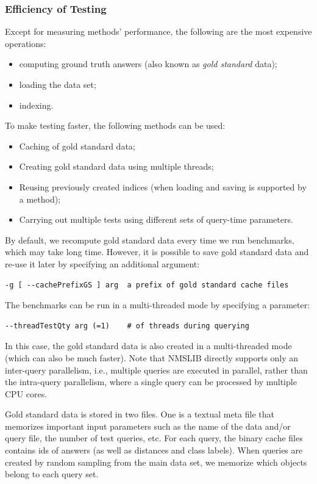 \documentclass[runningheads,a4paper]{llncs}
\begin{document}
{\subsubsection{Efficiency of Testing}\label{SectionBenchEfficiency}
Except for  measuring methods' performance, 
the following are the most expensive operations: 
\begin{itemize}
\item computing ground truth answers (also
known as \emph{gold standard} data);
\item loading the data set; 
\item indexing. 
\end{itemize}
To make testing faster, the following methods can be used: 
\begin{itemize}
\item Caching of gold standard data;
\item Creating gold standard data using multiple threads; 
\item Reusing previously created indices (when loading and saving is supported by a method);
\item Carrying out multiple tests using different sets of query-time parameters. 
\end{itemize}

By default, we recompute gold standard data every time we run benchmarks, which may take long time.
However, it is possible to save gold standard data and re-use it later
by specifying an additional argument:
\begin{verbatim}
-g [ --cachePrefixGS ] arg  a prefix of gold standard cache files
\end{verbatim}
The benchmarks can be run in a multi-threaded mode by specifying a parameter:
\begin{verbatim}
--threadTestQty arg (=1)    # of threads during querying
\end{verbatim}
In this case, the gold standard data is also created in a multi-threaded mode (which can also be much faster).
Note that NMSLIB directly supports only an inter-query parallelism, i.e., multiple queries are executed in parallel,
rather than the intra-query parallelism, where a single query can be processed by multiple CPU cores.

Gold standard data is stored in two files. One is a textual meta file
that memorizes important input parameters such as the name of the data and/or query file,
the number of test queries, etc. 
For each query, the binary cache files contains ids of answers (as well as distances and 
class labels). 
When queries are created by random sampling from the main data set,
we memorize which objects belong to each query set.

}
\end{document}
